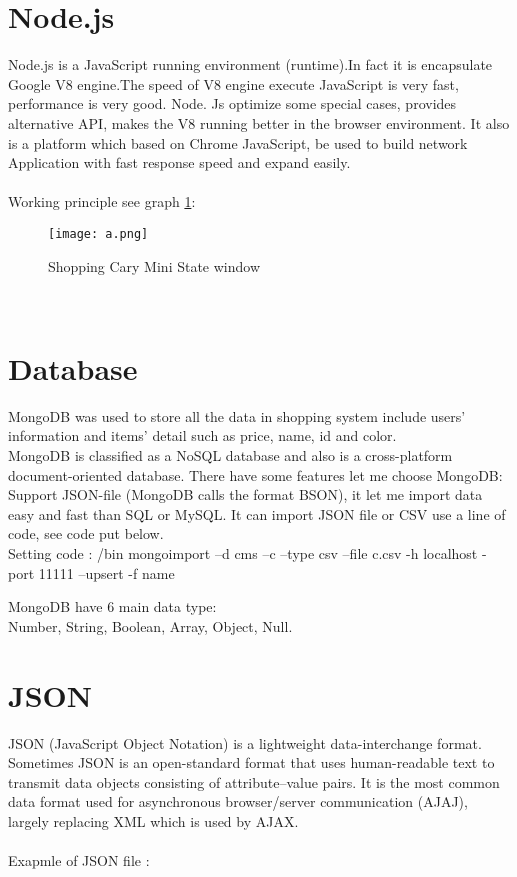\section{Node.js}
Node.js is a JavaScript running environment (runtime).In fact it is encapsulate Google V8 engine.The speed of V8 engine execute JavaScript is very fast, performance is very good. Node. Js optimize some special cases, provides alternative API, makes the V8 running better in the browser environment. 
It also is a platform which based on Chrome JavaScript, be used to build network Application with fast response speed and expand easily.\\
\\
Working principle see graph \ref{fig:bb cubed graph}:
\begin{figure}[h]
	\centering
	\texttt{[image: a.png]}
	\caption{Shopping Cary Mini State window}
	\label{fig:bb cubed graph}
\end{figure}
\\
\section{Database}	 
MongoDB was used to store all the data in shopping system include users' information and items' detail such as price, name, id and color.\\
MongoDB is classified as a NoSQL database and also is a cross-platform document-oriented database. \cite{2}
There have some features let me choose MongoDB:
Support JSON-file (MongoDB calls the format BSON), it let me import data easy and fast than SQL or MySQL. It can import JSON file or CSV use a line of code, see code put below.\\
Setting code : /bin  mongoimport –d cms –c –type csv –file c.csv -h localhost -port 11111 –upsert -f name

MongoDB have 6 main data type:\\
Number, String, Boolean, Array, Object, Null.

\section{JSON} \cite{11}
JSON (JavaScript Object Notation) is a lightweight data-interchange format. Sometimes JSON is an open-standard format that uses human-readable text to transmit data objects consisting of attribute–value pairs. It is the most common data format used for asynchronous browser/server communication (AJAJ), largely replacing XML which is used by AJAX.\\
\\
Exapmle of JSON file :

